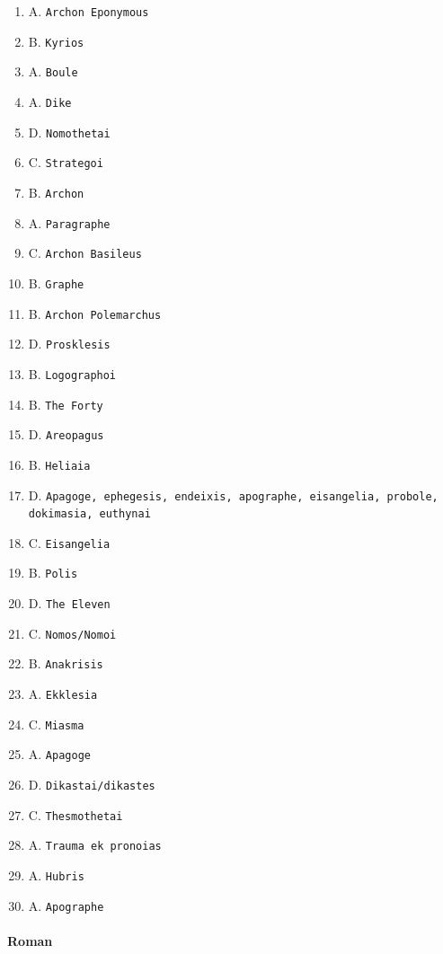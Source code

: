 \documentclass[11pt]{article}
\begin{document}
\begin{enumerate}
\item A. \texttt{Archon Eponymous}
\item B. \texttt{Kyrios}
\item A. \texttt{Boule}
\item A. \texttt{Dike}
\item D. \texttt{Nomothetai}
\item C. \texttt{Strategoi}
\item B. \texttt{Archon}
\item A. \texttt{Paragraphe}
\item C. \texttt{Archon Basileus}
\item B. \texttt{Graphe}
\item B. \texttt{Archon Polemarchus}
\item D. \texttt{Prosklesis}
\item B. \texttt{Logographoi}
\item B. \texttt{The Forty}
\item D. \texttt{Areopagus}
\item B. \texttt{Heliaia}
\item D. \texttt{Apagoge, ephegesis, endeixis, apographe, eisangelia, probole, dokimasia, euthynai}
\item C. \texttt{Eisangelia}
\item B. \texttt{Polis}
\item D. \texttt{The Eleven}
\item C. \texttt{Nomos/Nomoi}
\item B. \texttt{Anakrisis}
\item A. \texttt{Ekklesia}
\item C. \texttt{Miasma}
\item A. \texttt{Apagoge}
\item D. \texttt{Dikastai/dikastes}
\item C. \texttt{Thesmothetai}
\item A. \texttt{Trauma ek pronoias}
\item A. \texttt{Hubris}
\item A. \texttt{Apographe}
\end{enumerate}

\paragraph{Roman}
\end{document}
